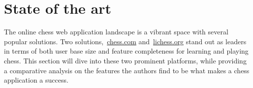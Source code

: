 \section{State of the art}\label{sec:state-of-the-art}

The online chess web application landscape is a vibrant space with several popular
solutions.
Two solutions,~\url{chess.com} and~\url{lichess.org} stand out as leaders in terms
of both user base size and feature completeness for learning and playing chess.
This section will dive into these two prominent platforms, while providing a
comparative analysis on the features the authors find to be what makes a
chess application a success.





